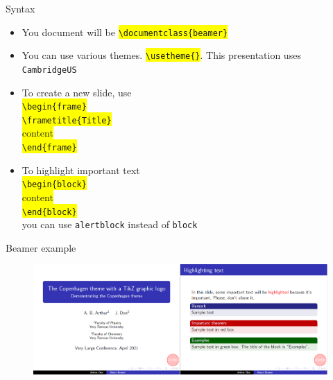 \documentclass[
11pt, %
]{beamer}
\begin{document}
	\begin{frame}{Syntax}
	\begin{itemize}
		\item You document will be \colorbox{yellow}{\texttt{\textbackslash documentclass\{beamer\}}}
		\item You can use various themes. \colorbox{yellow}{\texttt{\textbackslash usetheme\{\}}}. This presentation uses \texttt{CambridgeUS}
		\item To create a new slide, use \\
		\colorbox{yellow}{\texttt{\textbackslash begin\{frame\}}} \\
		\colorbox{yellow}{\texttt{\textbackslash frametitle\{Title\}}} \\
		\colorbox{yellow}{content} \\
		\colorbox{yellow}{\texttt{\textbackslash end\{frame\}}}
		\item To highlight important text \\
		\colorbox{yellow}{\texttt{\textbackslash begin\{block\}}} \\
		\colorbox{yellow}{content} \\
		\colorbox{yellow}{\texttt{\textbackslash end\{block\}}} \\
		you can use \texttt{alertblock} instead of \texttt{block}
	\end{itemize}
	\end{frame}
	
	\begin{frame}{Beamer example}
		\begin{figure}
			\includegraphics[scale=0.25]{beam.png}
		\end{figure}
	\end{frame}
	
\end{document}
